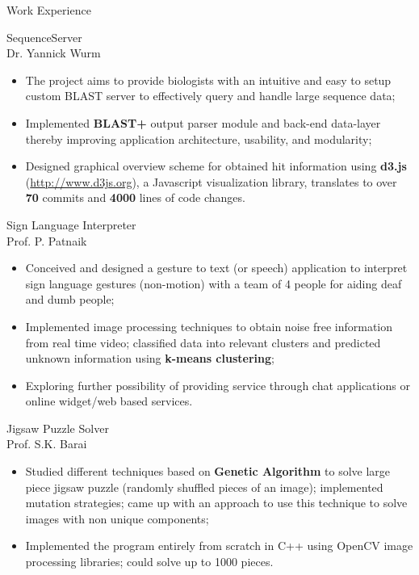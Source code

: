 \documentclass{article}
\newlength{\tabin}
\newlength{\secsep}
\newcommand{\lineunder}{\vspace*{-8pt} \\ \hspace*{-6pt} \hrulefill \\ \vspace*{-15pt}}
\newenvironment{tabbedsection}[1]{
  \begin{list}{}{
      \setlength{\itemsep}{0pt}
      \setlength{\labelsep}{0pt}
      \setlength{\labelwidth}{0pt}
      \setlength{\leftmargin}{\tabin}
      \setlength{\rightmargin}{\tabin}
      \setlength{\listparindent}{0pt}
      \setlength{\parsep}{0pt}
      \setlength{\parskip}{0pt}
      \setlength{\partopsep}{0pt}
      \setlength{\topsep}{#1}
    }
  \item[]
}{\end{list}}
\newenvironment{resume_section}[1]{
  \filbreak
  \vspace{2\secsep}
  \textsc{\large#1}
  \lineunder
  \begin{tabbedsection}{\secsep}
}{\end{tabbedsection}}
\newenvironment{resume_subsection}[2][]{
  \textbf{#2} \hfill {\footnotesize #1} \hspace*{-3.5em}
  \begin{tabbedsection}{0.5\secsep}
}{\end{tabbedsection}}
\newenvironment{subitems}{
  \renewcommand{\labelitemi}{$\cdot$}
  \begin{itemize}
      \setlength{\labelsep}{1em}
}{\end{itemize}}
\begin{document}
\begin{resume_section}  {Work Experience}
  \begin{resume_subsection}{SequenceServer \\ \footnotesize {Dr. Yannick Wurm}}
    \begin{subitems}
      \item The project aims to provide biologists with an intuitive and easy to setup custom BLAST server to effectively query and handle large sequence data;
      \item Implemented \textbf{BLAST+} output parser module and back-end data-layer thereby improving application architecture, usability, and modularity;
      \item Designed graphical overview scheme for obtained hit information using \textbf{d3.js} ({\footnotesize \url{http://www.d3js.org}}), a Javascript visualization library, translates to over \textbf{70} commits and \textbf{4000} lines of code changes. \\
    \end{subitems}
    \end{resume_subsection}

  \begin{resume_subsection}[Apr, 2014]{Sign Language Interpreter \\ \footnotesize {Prof. P. Patnaik}}
  \begin{subitems}
    \item Conceived and designed a gesture to text (or speech) application to interpret sign language gestures (non-motion) with a team of 4 people for aiding deaf and dumb people;
    \item Implemented image processing techniques to obtain noise free information from real time video; classified data into relevant clusters and predicted unknown information using \textbf{k-means clustering};
    \item Exploring further possibility of providing service through chat applications or online widget/web based services.\\
    \end{subitems}
  \end{resume_subsection}

  \begin{resume_subsection}[Mar, 2014]{Jigsaw Puzzle Solver \\ \footnotesize {Prof. S.K. Barai}}
    \begin{subitems}
    \item Studied different techniques based on \textbf{Genetic Algorithm} to solve large piece jigsaw puzzle (randomly shuffled pieces of an image); implemented mutation strategies; came up with an approach to use this technique to solve images with non unique components;
    \item Implemented the program entirely from scratch in C++ using OpenCV image processing libraries; could solve up to 1000 pieces.\\
    \end{subitems}
  \end{resume_subsection}


\end{resume_section}
\end{document}
